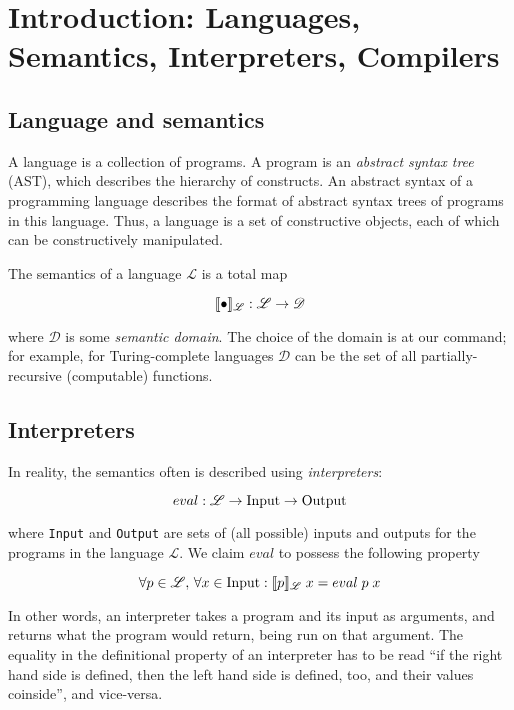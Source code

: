\section{Introduction: Languages, Semantics, Interpreters, Compilers}
  
\subsection{Language and semantics}

A language is a collection of programs. A program is an \emph{abstract syntax tree} (AST), which describes the hierarchy of constructs. An abstract
syntax of a programming language describes the format of abstract syntax trees of programs in this language. Thus, a language is a set of constructive
objects, each of which can be constructively manipulated.

The semantics of a language $\mathscr L$ is a total map

$$
\llbracket{\bullet}\rrbracket_{\mathscr L} : \mathscr L \to \mathscr D
$$

where $\mathscr D$ is some \emph{semantic domain}. The choice of the domain is at our command; for example, for Turing-complete languages $\mathscr D$ can
be the set of all partially-recursive (computable) functions.

\subsection{Interpreters}

In reality, the semantics often is described using \emph{interpreters}:

$$
eval : \mathscr L \to \mbox{\lstinline|Input|} \to \mbox{\lstinline|Output|}
$$

where \lstinline|Input| and \lstinline|Output| are sets of (all possible) inputs and outputs for the programs in the language $\mathscr L$. We claim $eval$ to
possess the following property

$$
\forall p \in \mathscr L,\, \forall x\in \mbox{\lstinline|Input|} : \sembr{p}_{\mathscr L}\;x = eval\; p\; x
$$

In other words, an interpreter takes a program and its input as arguments, and returns what the program would return, being run on that
argument. The equality in the definitional property of an interpreter has to be read ``if the right hand side is defined, then the left hand side
is defined, too, and their values coinside'', and vice-versa.


